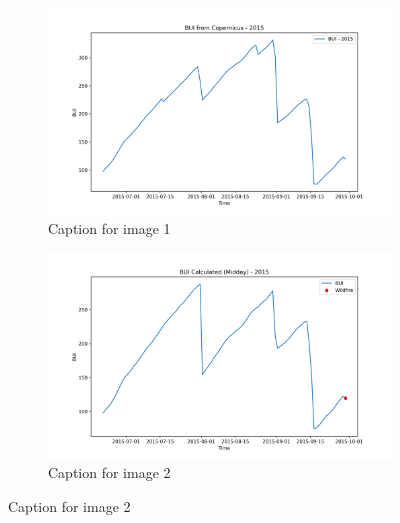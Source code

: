 \begin{figure}[h]
	\caption{HELLo}
	\centering
	\begin{subfigure}{0.49\textwidth}
		\centering
		\includegraphics[width=\textwidth]{graphs/2015/2015CopernicusBUI12.png}
		\caption{Caption for image 1}
		\label{fig:img1}
	\end{subfigure}
	\hfill
	\begin{subfigure}{0.49\textwidth}
		\centering
		\includegraphics[width=\textwidth]{graphs/2015/2015CalcBUI12.png}
		\caption{Caption for image 2}
		\label{fig:img2}
	\end{subfigure}
	\label{fig:both_images}
\end{figure}

